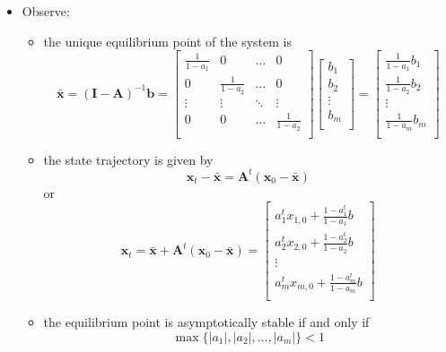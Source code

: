 \documentclass[12pt,a4paper]{article}
\begin{document}
\begin{itemize}
\begin{itemize}
  \item Observe:
    \begin{itemize}
    \item the unique equilibrium point of the system is
      \begin{equation}\nonumber%
        \bar{\bm{x}}
        =
        (\bm{I}-\bm{A})^{-1}\bm{b}
        =
      \begin{bmatrix}
        \frac{1}{1-a_{1}} & 0 & \ldots & 0 \\
        0 & \frac{1}{1-a_{2}} & \ldots & 0 \\
        \vdots & \vdots & \ddots & \vdots \\
        0 & 0 & \ldots & \frac{1}{1-a_{2}} \\
      \end{bmatrix}
      \begin{bmatrix}
        b_{1} \\
        b_{2} \\
        \vdots \\
        b_{m} \\
      \end{bmatrix}
        =
      \begin{bmatrix}
        \frac{1}{1-a_{1}}b_{1} \\
        \frac{1}{1-a_{2}}b_{2} \\
        \vdots \\
        \frac{1}{1-a_{m}}b_{m} \\
      \end{bmatrix}
      \end{equation}
    \item the state trajectory is given by
      \begin{equation}\nonumber%
        \bm{x}_{t} - \bar{\bm{x}}
        =
        \bm{A}^{t}(\bm{x}_{0} - \bar{\bm{x}})
    \end{equation}
    or
      \begin{equation}\nonumber%
        \bm{x}_{t}
        =
        \bar{\bm{x}}
        +
        \bm{A}^{t}(\bm{x}_{0} - \bar{\bm{x}})
        =
      \begin{bmatrix}
        a_{1}^{t}x_{1,0} + \frac{1-a_{1}^{t}}{1-a_{1}}b \\
        a_{2}^{t}x_{2,0} + \frac{1-a_{2}^{t}}{1-a_{2}}b \\
        \vdots \\
        a_{m}^{t}x_{m,0} + \frac{1-a_{m}^{t}}{1-a_{m}}b \\
      \end{bmatrix}
      \end{equation}
    \item the equilibrium point is asymptotically stable if and only if
      \begin{equation}\nonumber%
        \max\{|a_{1}|, |a_{2}|, \ldots, |a_{m}|\}<1
      \end{equation}
    \end{itemize}


\end{itemize}
\end{itemize}
\end{document}

